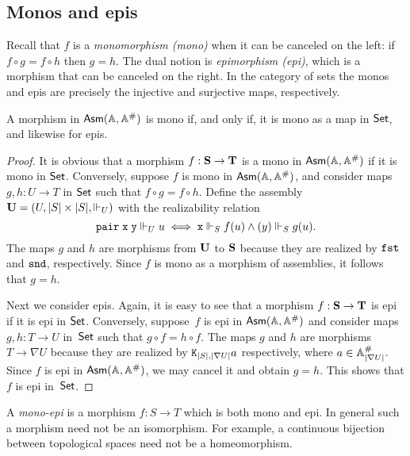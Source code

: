 \subsection{Monos and epis}
\label{sec:monos-epis}

Recall that $f$ is a \emph{monomorphism (mono)} when it can be
canceled on the left: if $f \circ g = f \circ h$ then $g = h$. The
dual notion is \emph{epimorphism (epi)}, which is a morphism that can
be canceled on the right. In the category of sets the monos and epis
are precisely the injective and surjective maps, respectively.

\begin{proposition}
  \label{prop:asm-mono-epi-when}%
  A morphism in $\mathsf{Asm}(\mathbb{A},\mathbb{A}^{\#})$ is mono if, and only if, it is mono as a map
  in $\mathsf{Set}$, and likewise for epis.
\end{proposition}

\begin{proof}
  It is obvious that a morphism $f : \mathbf{S} \to \mathbf{T}$ is a mono in
  $\mathsf{Asm}(\mathbb{A},\mathbb{A}^{\#})$ if it is mono in $\mathsf{Set}$. Conversely, suppose $f$ is mono in
  $\mathsf{Asm}(\mathbb{A},\mathbb{A}^{\#})$, and consider maps $g, h : U \to T$ in $\mathsf{Set}$ such that $f
  \circ g = f \circ h$. Define the assembly $\mathbf{U} = (U, |S| \times
  |S|, {\Vdash_U})$ with the realizability relation
  \begin{equation*}
    \mathtt{pair}\;\mathtt{x}\;\mathtt{y} \Vdash_U u
    \iff \mathtt{x} \Vdash_S f(u) \land \mathtt{(}y) \Vdash_S g(u).
  \end{equation*}
  The maps $g$ and $h$ are morphisms from $\mathbf{U}$ to $\mathbf{S}$
  because they are realized by $\mathtt{fst}$ and $\mathtt{snd}$,
  respectively. Since $f$ is mono as a morphism of assemblies, it
  follows that $g = h$.

  Next we consider epis. Again, it is easy to see that a morphism $f :
  \mathbf{S} \to \mathbf{T}$ is epi if it is epi in $\mathsf{Set}$. Conversely,
  suppose~$f$ is epi in $\mathsf{Asm}(\mathbb{A},\mathbb{A}^{\#})$ and consider maps $g, h : T \to U$
  in~$\mathsf{Set}$ such that $g \circ f = h \circ f$. The maps $g$ and $h$
  are morphisms $T \to \nabla U$ because they are realized by
  $\mathtt{K}_{|S|,|\nabla U|} a$ respectively, where $a \in
  \mathbb{A}^{\#}_{|\nabla U|}$. Since $f$ is epi in $\mathsf{Asm}(\mathbb{A},\mathbb{A}^{\#})$, we may cancel
  it and obtain $g = h$. This shows that $f$ is epi in~$\mathsf{Set}$.
\end{proof}

A \emph{mono-epi} is a morphism $f : S \to T$ which is both mono and
epi. In general such a morphism need not be an isomorphism. For
example, a continuous bijection between topological spaces need not be
a homeomorphism.

